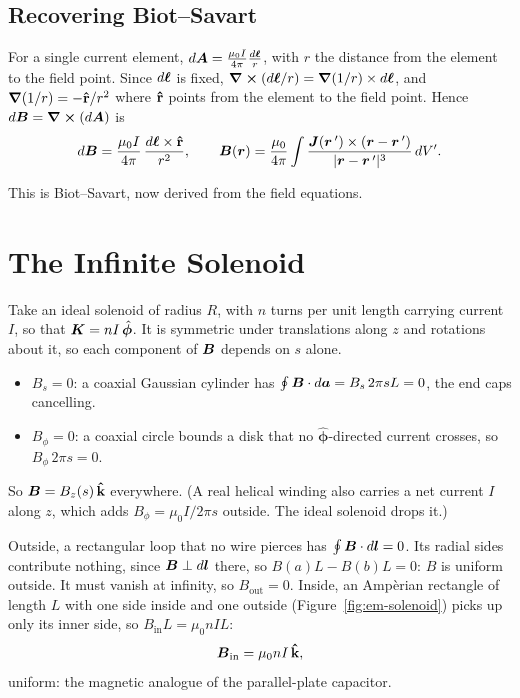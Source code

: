 \subsection{Recovering Biot--Savart}
\label{sec:em-bs-from-a}

For a single current element, $d\vect{A} = \frac{\mu_0 I}{4\pi}\frac{d\lvect{\ell}}{r}$, with $r$ the distance from the element to the field point. Since $d\bm{\ell}$ is fixed, $\curl(d\bm{\ell}/r) = \grad(1/r)\times d\bm{\ell}$, and $\grad(1/r) = -\boldsymbol{\hat{\textbf{r}}}/r^2$ where $\boldsymbol{\hat{\textbf{r}}}$ points from the element to the field point. Hence $d\vect{B}=\curl(d\vect{A})$ is
\[
    d\vect{B} = \frac{\mu_0 I}{4\pi}\,\frac{d\lvect{\ell}\times\rhat}{r^2},
    \qquad
    \vect{B}(\lvect{r}) = \frac{\mu_0}{4\pi}\int\frac{\vect{J}(\lvect{r}\,')\times(\lvect{r}-\lvect{r}\,')}{|\lvect{r}-\lvect{r}\,'|^3}\,dV'.
\]

This is Biot--Savart, now derived from the field equations.

\section{The Infinite Solenoid}
\label{sec:em-solenoid}

Take an ideal solenoid of radius $R$, with $n$ turns per unit length carrying current $I$, so that $\vect{K} = nI\,\hat{\boldsymbol{\phi}}$. It is symmetric under translations along $z$ and rotations about it, so each component of $\vect{B}$ depends on $s$ alone.
\begin{itemize}
    \item $B_s = 0$: a coaxial Gaussian cylinder has $\oint\vect{B}\cdot d\lvect{a} = B_s\,2\pi sL = 0$, the end caps cancelling.
    \item $B_\phi = 0$: a coaxial circle bounds a disk that no $\hat{\boldsymbol{\phi}}$-directed current crosses, so $B_\phi\,2\pi s = 0$.
\end{itemize}
So $\vect{B} = B_z(s)\,\khat$ everywhere. (A real helical winding also carries a net current $I$ along $z$, which adds $B_\phi = \mu_0I/2\pi s$ outside. The ideal solenoid drops it.)

Outside, a rectangular loop that no wire pierces has $\oint\vect{B}\cdot d\lvect{l} = 0$. Its radial sides contribute nothing, since $\vect{B}\perp d\lvect{l}$ there, so $B(a)L - B(b)L = 0$: $B$ is uniform outside. It must vanish at infinity, so $B_{\text{out}} = 0$. Inside, an Amp\`erian rectangle of length $L$ with one side inside and one outside (Figure~\ref{fig:em-solenoid}) picks up only its inner side, so $B_{\text{in}}L = \mu_0nIL$:
\[
    \vect{B}_{\text{in}} = \mu_0nI\,\khat,
\]
uniform: the magnetic analogue of the parallel-plate capacitor.

